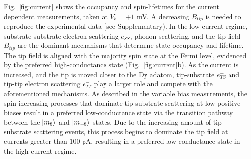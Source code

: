 \documentclass[
reprint,amsmath,amssymb,aps]{revtex4-2}
\begin{document}
Fig.~\ref{fig:current} shows the occupancy and spin-lifetimes for the current dependent measurements, taken at $V_{b} = +1$ mV. A decreasing $B_{tip}$ is needed to reproduce the experimental data (see Supplementary). In the low current regime, substrate-substrate electron scattering $e^{-}_{SS}$, phonon scattering, and the tip field $B_{tip}$ are the dominant mechanisms that determine state occupancy and lifetime. The tip field is aligned with the majority spin state at the Fermi level, evidenced by the preferred high-conductance state (Fig.~\ref{fig:current}b). As the current is increased, and the tip is moved closer to the Dy adatom, tip-substrate $e^{-}_{TS}$ and tip-tip electron scattering $e^{-}_{TT}$ play a larger role and compete with the aforementioned mechanisms. As described in the variable bias measurements, the spin increasing processes that dominate tip-substrate scattering at low positive biases result in a preferred low-conductance state via the transition pathway between the $\ket{m_{8}}$ and $\ket{m_{-8}}$ states. Due to the increasing amount of tip-substrate scattering events, this process begins to dominate the tip field at currents greater than $100$ pA, resulting in a preferred low-conductance state in the high current regime. 




\end{document}
